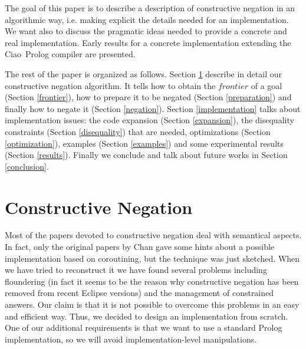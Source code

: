 \documentclass{llncs}
\newcommand{\ciao}{Ciao}
\begin{document}
The goal of this paper is to describe a description of constructive negation
in an algorithmic way, i.e. making explicit the details needed for an 
implementation. We want also to discuss the pragmatic ideas needed to
provide a concrete and real implementation. Early results for a concrete 
implementation extending the \ciao\ Prolog compiler are presented.


The rest of the paper is organized as follows. Section
\ref{constructive} describe in detail our constructive negation
algorithm. It tells how to obtain the $frontier$ of a goal (Section
\ref{frontier}), how to prepare it to be negated (Section
\ref{preparation}) and finally how to negate it (Section
\ref{negation}). Section \ref{implementation} talks about
implementation issues: the code expansion (Section \ref{expansion}),
the disequality constraints (Section \ref{disequality}) that are
needed, optimizations (Section \ref{optimization}), examples (Section
\ref{examples}) and some experimental results (Section \ref{results}).
Finally we conclude and talk about future works in Section
\ref{conclusion}.
 


\section{Constructive Negation}
\label{constructive}

Most of the papers devoted to constructive negation deal 
with semantical aspects. In fact, only the original papers by Chan gave some hints
about a possible implementation based on coroutining, but the
technique was just sketched. When we have tried to reconstruct it we
have found several problems including floundering (in fact it seems to
be the reason why constructive negation has been removed from recent
Eclipse versions) and the management of constrained answers. 
Our claim is that it is not possible to overcome this problems in an easy
and efficient way.
Thus, we decided to design an implementation from
scratch.  One of our additional requirements is 
that we want to use a standard Prolog implementation, so we
will avoid implementation-level manipulations.
\end{document}
